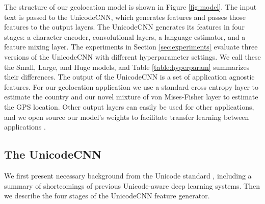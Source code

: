 \documentclass[sigconf,anonymous,review]{acmart}
\renewcommand{\times}{\mathbin{\tikz [x=1.4ex,y=1.4ex,line width=.1ex] \draw (0,0) -- (1,1) (0,1) -- (1,0);}}%
\begin{document}
The structure of our geolocation model is shown in Figure \ref{fig:model}.
The input text is passed to the UnicodeCNN,
which generates features and passes those features to the output layers.
The UnicodeCNN generates its features in four stages:
a character encoder,
convolutional layers,
a language estimator,
and a feature mixing layer.
The experiments in Section \ref{sec:experiments} evaluate three versions of the UnicodeCNN with different hyperparameter settings.
We call these the Small, Large, and Huge models,
and Table \ref{table:hyperparam} summarizes their differences.
The output of the UnicodeCNN is a set of application agnostic features.
For our geolocation application we use a standard cross entropy layer to estimate the country and our novel mixture of von Mises-Fisher layer to estimate the GPS location.
Other output layers can easily be used for other applications,
and we open source our model's weights to facilitate transfer learning between applications \citep{wang2015transfer}.

\subsection{The UnicodeCNN}

We first present necessary background from the Unicode standard \citep{Unicode},
including a summary of shortcomings of previous Unicode-aware deep learning systems.
Then we describe the four stages of the UnicodeCNN feature generator.
\end{document}
